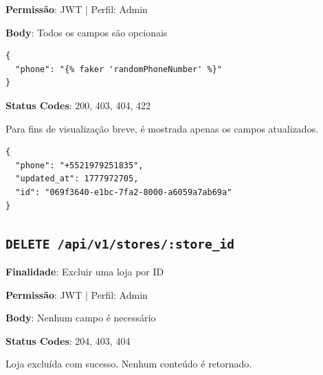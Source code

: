 \noindent\textbf{Permissão}: JWT | Perfil: Admin

\noindent\textbf{Body}: Todos os campos são opcionais

\vspace{-0.2cm}

\begin{verbatim}
{
  "phone": "{% faker 'randomPhoneNumber' %}"
}
\end{verbatim}

\noindent\textbf{Status Codes}: 200, 403, 404, 422

\begin{tcolorbox}[colback=green!5, colframe=black, title=\textbf{200 OK}]
Para fins de visualização breve, é mostrada apenas os campos atualizados.
\begin{verbatim}
{
  "phone": "+5521979251835",
  "updated_at": 1777972705,
  "id": "069f3640-e1bc-7fa2-8000-a6059a7ab69a"
}
\end{verbatim}
\end{tcolorbox}

\subsection{\texttt{DELETE /api/v1/stores/:store\_id}}

\noindent\textbf{Finalidade}: Excluir uma loja por ID

\noindent\textbf{Permissão}: JWT | Perfil: Admin

\noindent\textbf{Body}: Nenhum campo é necessário

\noindent\textbf{Status Codes}: 204, 403, 404

\begin{tcolorbox}[colback=green!5, colframe=black, title=\textbf{204 No Content}]
Loja excluída com sucesso. Nenhum conteúdo é retornado.
\end{tcolorbox}
